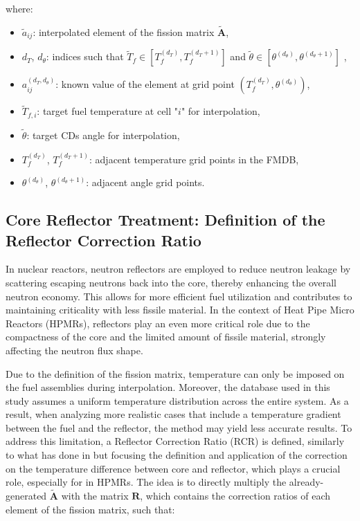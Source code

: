 \documentclass[preprint,review,12pt]{elsarticle}
\begin{document}
where:
\begin{itemize}
  \item $\tilde{a}_{ij}$: interpolated element of the fission matrix $\tilde{\mathbf{A}}$,
  \item $d_T$, $d_{\theta}$: indices such that $\tilde{T}_f \in [T_f^{(d_T)}, T_f^{(d_T+1)}]$ and $\tilde{\theta} \in [\theta^{(d_{\theta})}, \theta^{(d_{\theta}+1)}]$  ,
  \item $a_{ij}^{(d_T, d_{\theta})}$: known value of the element at grid point $(T_f^{(d_T)}, \theta^{(d_{\theta})})$,
  \item $\tilde{T}_{f,i}$: target fuel temperature at cell "$i$" for interpolation,
  \item $\tilde{\theta}$: target CDs angle for interpolation,
  \item $T_f^{(d_T)}$, $T_f^{(d_T+1)}$: adjacent temperature grid points in the FMDB,
  \item $\theta^{(d_{\theta})}$, $\theta^{(d_{\theta}+1)}$: adjacent angle grid points.
\end{itemize}


\subsection{Core Reflector Treatment: Definition of the Reflector Correction Ratio}
In nuclear reactors, neutron reflectors are employed to reduce neutron leakage by scattering escaping neutrons back into the core, thereby enhancing the overall neutron economy. This allows for more efficient fuel utilization and contributes to maintaining criticality with less fissile material. In the context of Heat Pipe Micro Reactors (HPMRs), reflectors play an even more critical role due to the compactness of the core and the limited amount of fissile material, strongly affecting the neutron flux shape.

Due to the definition of the fission matrix, temperature can only be imposed on the fuel assemblies during interpolation. Moreover, the database used in this study assumes a uniform temperature distribution across the entire system. As a result, when analyzing more realistic cases that include a temperature gradient between the fuel and the reflector, the method may yield less accurate results. To address this limitation, a Reflector Correction Ratio (RCR) is defined, similarly to what has done in \cite{Rau2020} but focusing the definition and application of the correction on the temperature difference between core and reflector, which plays a crucial role, especially for in HPMRs. The idea is to directly multiply the already-generated $\tilde{\textbf{A}}$ with the matrix $\textbf{R}$, which contains the correction ratios of each element of the fission matrix, such that: 
\end{document}
